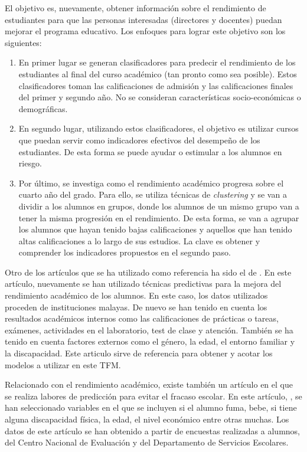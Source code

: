 El objetivo es, nuevamente, obtener información sobre el rendimiento de estudiantes para que las personas interesadas (directores y docentes) puedan mejorar el programa educativo. Los enfoques para lograr este objetivo son los siguientes:

\begin{enumerate}
\item En primer lugar se generan clasificadores para predecir el rendimiento de los estudiantes al final del curso académico (tan pronto como sea posible). Estos clasificadores toman las calificaciones de admisión y las calificaciones finales del primer y segundo año. No se consideran características socio-económicas o demográficas.
\item En segundo lugar, utilizando estos clasificadores, el objetivo es utilizar cursos que puedan servir como indicadores efectivos del desempeño de los estudiantes. De esta forma se puede ayudar o estimular a los alumnos en riesgo.
\item Por último, se investiga como el rendimiento académico progresa sobre el cuarto año del grado. Para ello, se utiliza técnicas de \textit{clustering} y se van a dividir a los alumnos en grupos, donde los alumnos de un mismo grupo van a tener la misma progresión en el rendimiento. De esta forma, se van a agrupar los alumnos que hayan tenido bajas calificaciones y aquellos que han tenido altas calificaciones a lo largo de sus estudios. La clave es obtener y comprender los indicadores propuestos en el segundo paso.
\end{enumerate}

Otro de los artículos que se ha utilizado como referencia ha sido el de . En este artículo, nuevamente se han utilizado técnicas predictivas para la mejora del rendimiento académico de los alumnos. En este caso, los datos utilizados proceden de instituciones malayas. De nuevo se han tenido en cuenta los resultados académicos internos como las calificaciones de prácticas o tareas, exámenes, actividades en el laboratorio, test de clase y atención. También se ha tenido en cuenta factores externos como el género, la edad, el entorno familiar y la discapacidad. Este articulo sirve de referencia para obtener y acotar los modelos a utilizar en este TFM.

Relacionado con el rendimiento académico, existe también un artículo en el que se realiza labores de predicción para evitar el fracaso escolar. En este artículo, \cite{vera2012prediccion}, se han seleccionado variables en el que se incluyen si el alumno fuma, bebe, si tiene alguna discapacidad física, la edad, el nivel económico entre otras muchas. Los datos de este artículo se han obtenido a partir de encuestas realizadas a alumnos, del Centro Nacional de Evaluación y del Departamento de Servicios Escolares.

